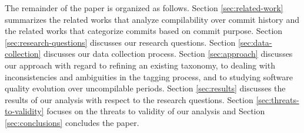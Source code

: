 The remainder of the paper is organized as follows.
Section \ref{sec:related-work} summarizes the related works that analyze compilability over commit history and the related works that categorize commits based on commit purpose. 
Section \ref{sec:research-questions} discusses our research questions.
Section \ref{sec:data-collection} discusses our data collection process.
Section \ref{sec:approach} discusses our approach with regard to refining an existing taxonomy, to dealing with inconsistencies and ambiguities in the tagging process, and to studying software quality evolution over uncompilable periods. 
Section \ref{sec:results} discusses the results of our analysis with respect to the research questions.
Section \ref{sec:threats-to-validity} focuses on the threats to validity of our analysis and Section \ref{sec:conclusions} concludes the paper.



